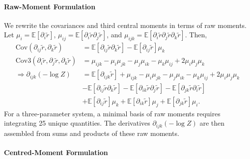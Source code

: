 \documentclass{article}
\begin{document}
\paragraph{Raw-Moment Formulation}

We rewrite the covariances and third central moments in terms of raw moments.
Let $\mu_{i} = \mathbb{E}[\partial_{i} \tilde{r}]$, $\mu_{ij} = \mathbb{E}[\partial_{i} \tilde{r} \partial_{j} \tilde{r}]$, and $\mu_{ijk} = \mathbb{E}[\partial_{i} \tilde{r} \partial_{j} \tilde{r} \partial_{k} \tilde{r}]$.
Then,
%
\begin{align}
  \mathrm{Cov}(\partial_{ij} \tilde{r}, \partial_{k} \tilde{r})                         & = \mathbb{E}[\partial_{ij} \tilde{r} \partial_{k} \tilde{r}] - \mathbb{E}[\partial_{ij} \tilde{r}] \mu_{k}                                                                                       \\
  \mathrm{Cov3}(\partial_{i} \tilde{r}, \partial_{j} \tilde{r}, \partial_{k} \tilde{r}) & = \mu_{ijk} - \mu_{i} \mu_{jk} - \mu_{j} \mu_{ik} - \mu_{k} \mu_{ij} + 2 \mu_{i} \mu_{j} \mu_{k}                                                                                                 \\
  \Rightarrow \partial_{ijk} (-\log Z)                                                  & = \mathbb{E}[\partial_{ijk} \tilde{r}] + \mu_{ijk} - \mu_{i} \mu_{jk} - \mu_{j} \mu_{ik} - \mu_{k} \mu_{ij} + 2 \mu_{i} \mu_{j} \mu_{k} \label{eq:neglogz-third-derivative-raw-moment}           \\
                                                                                        & - \mathbb{E}[\partial_{ij} \tilde{r} \partial_{k} \tilde{r}] - \mathbb{E}[\partial_{ik} \tilde{r} \partial_{j} \tilde{r}] - \mathbb{E}[\partial_{jk} \tilde{r} \partial_{i} \tilde{r}] \nonumber \\
                                                                                        & + \mathbb{E}[\partial_{ij} \tilde{r}] \mu_{k} + \mathbb{E}[\partial_{ik} \tilde{r}] \mu_{j} + \mathbb{E}[\partial_{jk} \tilde{r}] \mu_{i}. \nonumber
\end{align}
%
For a three-parameter system, a minimal basis of raw moments requires integrating 25 unique quantities.
The derivatives $\partial_{ijk} (-\log Z)$ are then assembled from sums and products of these raw moments.

\paragraph{Centred-Moment Formulation}
\end{document}
